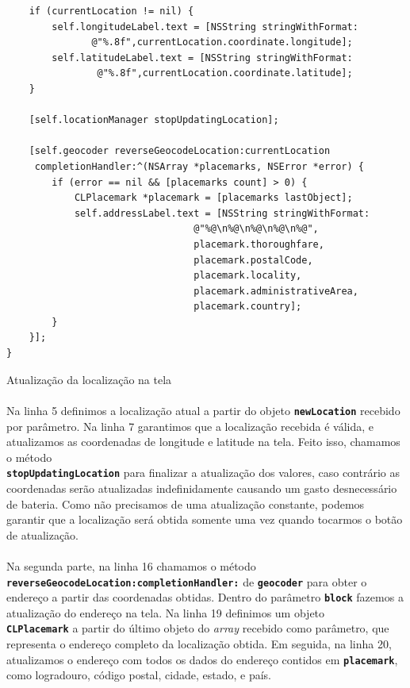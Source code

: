 \documentclass[a4paper,12pt,brazil,doubleside]{book}
\begin{document}
\begin{singlespace}
\begin{listing}[H]
\begin{verbatim}
    if (currentLocation != nil) {
        self.longitudeLabel.text = [NSString stringWithFormat:
               @"%.8f",currentLocation.coordinate.longitude];
        self.latitudeLabel.text = [NSString stringWithFormat:
                @"%.8f",currentLocation.coordinate.latitude];
    }
    
    [self.locationManager stopUpdatingLocation];
    
    [self.geocoder reverseGeocodeLocation:currentLocation
     completionHandler:^(NSArray *placemarks, NSError *error) {
        if (error == nil && [placemarks count] > 0) {
            CLPlacemark *placemark = [placemarks lastObject];
            self.addressLabel.text = [NSString stringWithFormat:
                                 @"%@\n%@\n%@\n%@\n%@",
                                 placemark.thoroughfare,
                                 placemark.postalCode,
                                 placemark.locality,
                                 placemark.administrativeArea,
                                 placemark.country];
        }
    }];
}
\end{verbatim}
\caption{Atualização da localização na tela}
\end{listing}

\paragraph{}Na linha 5 definimos a localização atual a partir do objeto \texttt{\textbf{newLocation}} recebido por parâmetro. Na linha 7 garantimos que a localização recebida é válida, e atualizamos as coordenadas de longitude e latitude na tela. Feito isso, chamamos o método\\ \texttt{\textbf{stopUpdatingLocation}} para finalizar a atualização dos valores, caso contrário as coordenadas serão atualizadas indefinidamente causando um gasto desnecessário de bateria. Como não precisamos de uma atualização constante, podemos garantir que a localização será obtida somente uma vez quando tocarmos o botão de atualização.
\paragraph{}Na segunda parte, na linha 16 chamamos o método\\ \texttt{\textbf{reverseGeocodeLocation:completionHandler:}} de \texttt{\textbf{geocoder}} para obter o endereço a partir das coordenadas obtidas. Dentro do parâmetro \texttt{\textbf{block}} fazemos a atualização do endereço na tela. Na linha 19 definimos um objeto\\ \texttt{\textbf{CLPlacemark}} a partir do último objeto do \emph{array} recebido como parâmetro, que representa o endereço completo da localização obtida. Em seguida, na linha 20, atualizamos o endereço com todos os dados do endereço contidos em \texttt{\textbf{placemark}}, como logradouro, código postal, cidade, estado, e país.

\end{singlespace}
\end{document}
